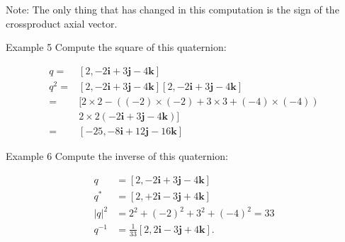 Note: The only thing that has changed in this computation is the sign of the crossproduct axial vector.

Example 5 Compute the square of this quaternion:

$$
\begin{aligned}
q= & {[2,-2 \mathbf{i}+3 \mathbf{j}-4 \mathbf{k}] } \\
q^{2}= & {[2,-2 \mathbf{i}+3 \mathbf{j}-4 \mathbf{k}][2,-2 \mathbf{i}+3 \mathbf{j}-4 \mathbf{k}] } \\
= & {[2 \times 2-((-2) \times(-2)+3 \times 3+(-4) \times(-4))} \\
& 2 \times 2(-2 \mathbf{i}+3 \mathbf{j}-4 \mathbf{k})] \\
= & {[-25,-8 \mathbf{i}+12 \mathbf{j}-16 \mathbf{k}] }
\end{aligned}
$$

Example 6 Compute the inverse of this quaternion:

$$
\begin{aligned}
q & =[2,-2 \mathbf{i}+3 \mathbf{j}-4 \mathbf{k}] \\
q^{*} & =[2,+2 \mathbf{i}-3 \mathbf{j}+4 \mathbf{k}] \\
|q|^{2} & =2^{2}+(-2)^{2}+3^{2}+(-4)^{2}=33 \\
q^{-1} & =\frac{1}{33}[2,2 \mathbf{i}-3 \mathbf{j}+4 \mathbf{k}] .
\end{aligned}
$$
